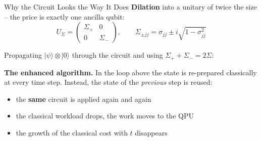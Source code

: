 \begin{frame}[t]{}
\begin{postercolumn}
\begin{block}{Why the Circuit Looks the Way It Does}
    \textbf{Dilation} into a unitary of twice the size -- the price is
    exactly one ancilla qubit:
    \[ U_\Sigma = \begin{pmatrix} \Sigma_+ & 0\\ 0 & \Sigma_-\end{pmatrix},
       \qquad
       \Sigma_{\pm jj} = \sigma_{jj} \pm i\sqrt{1-\sigma_{jj}^2} \]


    Propagating $|\psi\rangle\otimes|0\rangle$ through the circuit and using
    $\Sigma_++\Sigma_-=2\Sigma$:

    \smallskip

    \textbf{The enhanced algorithm.} In the loop above the state is
    re-prepared classically at every time step. Instead, the state of the
    \emph{previous} step is reused:
    \begin{itemize}\tightlist
      \item the \textbf{same} circuit is applied again and again
      \item the classical workload drops, the work moves to the QPU
      \item the growth of the classical cost with $t$ disappears
    \end{itemize}
  \end{block}


\end{postercolumn}
\end{frame}
